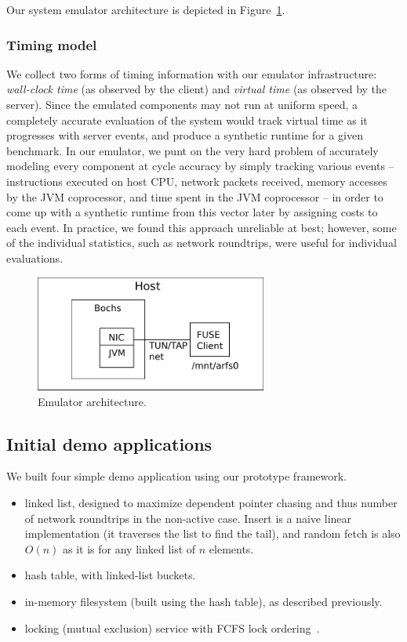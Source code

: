 \documentclass[10pt]{article}
\begin{document}
Our system emulator architecture is depicted in Figure~\ref{fig:fig4}.

\subsubsection{Timing model}

We collect two forms of timing information with our emulator
infrastructure: \emph{wall-clock time} (as observed by the client) and
\emph{virtual time} (as observed by the server). Since the emulated
components may not run at uniform speed, a completely accurate
evaluation of the system would track virtual time as it progresses
with server events, and produce a synthetic runtime for a given
benchmark. In our emulator, we punt on the very hard problem of
accurately modeling every component at cycle accuracy by simply
tracking various events -- instructions executed on host CPU, network
packets received, memory accesses by the JVM coprocessor, and time
spent in the JVM coprocessor -- in order to come up with a synthetic
runtime from this vector later by assigning costs to each event. In
practice, we found this approach unreliable at best; however, some of
the individual statistics, such as network roundtrips, were useful for
individual evaluations.

\begin{figure}
\centering
\includegraphics[width=3in]{fig/fig4.pdf}
\caption{Emulator architecture.}
\label{fig:fig4}
\end{figure}
  
\subsection{Initial demo applications}

We built four simple demo application using our prototype framework. 

\begin{itemize}
\item linked list, designed to maximize dependent pointer chasing and
  thus number of network roundtrips in the non-active case. Insert is
  a naive linear implementation (it traverses the list to find the
  tail), and random fetch is also $O(n)$ as it is for any linked list
  of $n$ elements.
\item hash table, with linked-list buckets.
\item in-memory filesystem (built using the hash table), as described
  previously.
\item locking (mutual exclusion) service with FCFS lock ordering~\cite{nic-basedatomic}.  
\end{itemize}
\end{document}
